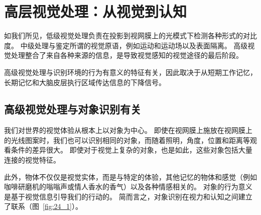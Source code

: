 \chapter{高层视觉处理：从视觉到认知} \label{chap:chap24}

如我们所见，低级视觉处理负责在投影到视网膜上的光模式下检测各种形式的对比度。
中级处理与鉴定所谓的视觉原语，例如运动和运动场以及表面隔离。
高级视觉处理整合了来自各种来源的信息，是导致视觉感知的视觉途径的最后阶段。


高级视觉处理与识别环境的行为有意义的特征有关，因此取决于从短期工作记忆，长期记忆和大脑皮层执行区域传达信息的下降信号。


\section{高级视觉处理与对象识别有关}

我们对世界的视觉体验从根本上以对象为中心。
即使在视网膜上施放在视网膜上的光线图案时，我们也可以识别相同的对象，而随着照明，角度，位置和距离等观看条件的差异很大。
即使对于视觉上复杂的对象，也是如此，这些对象包括大量连接的视觉特征。


此外，物体不仅仅是视觉实体，而是与特定的体验，其他记忆的物体和感觉（例如咖啡研磨机的嗡嗡声或情人香水的香气）以及各种情感相关的。
对象的行为意义是基于视觉信息引导我们的行动的。
简而言之，对象识别在视力和认知之间建立了联系（图~\ref{fig:24_1}）。


